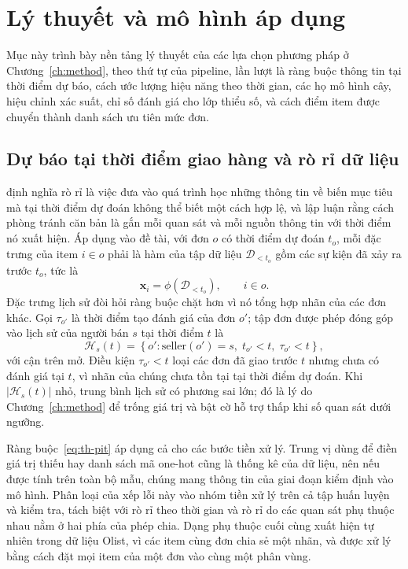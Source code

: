 \section{Lý thuyết và mô hình áp dụng}\label{sec:theory-models}

Mục này trình bày nền tảng lý thuyết của các lựa chọn phương pháp ở Chương~\ref{ch:method}, theo thứ tự của pipeline, lần lượt là ràng buộc thông tin tại thời điểm dự báo, cách ước lượng hiệu năng theo thời gian, các họ mô hình cây, hiệu chỉnh xác suất, chỉ số đánh giá cho lớp thiểu số, và cách điểm item được chuyển thành danh sách ưu tiên mức đơn.

\subsection{Dự báo tại thời điểm giao hàng và rò rỉ dữ liệu}\label{sec:th-pit}

\textcite{kaufman2012} định nghĩa rò rỉ là việc đưa vào quá trình học những thông tin về biến mục tiêu mà tại thời điểm dự đoán không thể biết một cách hợp lệ, và lập luận rằng cách phòng tránh căn bản là gắn mỗi quan sát và mỗi nguồn thông tin với thời điểm nó xuất hiện. Áp dụng vào đề tài, với đơn $o$ có thời điểm dự đoán $t_o$, mỗi đặc trưng của item $i \in o$ phải là hàm của tập dữ liệu $\mathcal{D}_{<t_o}$ gồm các sự kiện đã xảy ra trước $t_o$, tức là
\begin{equation}\label{eq:th-pit}
  \mathbf{x}_i = \phi\left(\mathcal{D}_{<t_o}\right), \qquad i \in o .
\end{equation}
Đặc trưng lịch sử đòi hỏi ràng buộc chặt hơn vì nó tổng hợp nhãn của các đơn khác. Gọi $\tau_{o'}$ là thời điểm tạo đánh giá của đơn $o'$; tập đơn được phép đóng góp vào lịch sử của người bán $s$ tại thời điểm $t$ là
\begin{equation}\label{eq:th-history}
  \mathcal{H}_s(t) = \left\{ o' : \mathrm{seller}(o') = s,\; t_{o'} < t,\; \tau_{o'} < t \right\},
\end{equation}
với cận trên mở. Điều kiện $\tau_{o'} < t$ loại các đơn đã giao trước $t$ nhưng chưa có đánh giá tại $t$, vì nhãn của chúng chưa tồn tại tại thời điểm dự đoán. Khi $|\mathcal{H}_s(t)|$ nhỏ, trung bình lịch sử có phương sai lớn; đó là lý do Chương~\ref{ch:method} để trống giá trị và bật cờ hỗ trợ thấp khi số quan sát dưới ngưỡng.

Ràng buộc~\eqref{eq:th-pit} áp dụng cả cho các bước tiền xử lý. Trung vị dùng để điền giá trị thiếu hay danh sách mã one-hot cũng là thống kê của dữ liệu, nên nếu được tính trên toàn bộ mẫu, chúng mang thông tin của giai đoạn kiểm định vào mô hình. Phân loại của \textcite{kapoor2023} xếp lỗi này vào nhóm tiền xử lý trên cả tập huấn luyện và kiểm tra, tách biệt với rò rỉ theo thời gian và rò rỉ do các quan sát phụ thuộc nhau nằm ở hai phía của phép chia. Dạng phụ thuộc cuối cùng xuất hiện tự nhiên trong dữ liệu Olist, vì các item cùng đơn chia sẻ một nhãn, và được xử lý bằng cách đặt mọi item của một đơn vào cùng một phân vùng.

